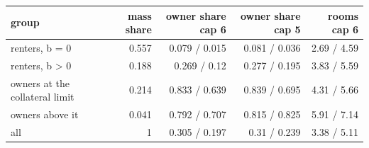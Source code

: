 \begin{tabular}{lrrrr}
\toprule
group & mass share & owner share cap 6 & owner share cap 5 & rooms cap 6 \\
\midrule
renters, b = 0 & 0.557 & 0.079 / 0.015 & 0.081 / 0.036 & 2.69 / 4.59 \\
renters, b > 0 & 0.188 & 0.269 / 0.12 & 0.277 / 0.195 & 3.83 / 5.59 \\
owners at the collateral limit & 0.214 & 0.833 / 0.639 & 0.839 / 0.695 & 4.31 / 5.66 \\
owners above it & 0.041 & 0.792 / 0.707 & 0.815 / 0.825 & 5.91 / 7.14 \\
all & 1 & 0.305 / 0.197 & 0.31 / 0.239 & 3.38 / 5.11 \\
\bottomrule
\end{tabular}
